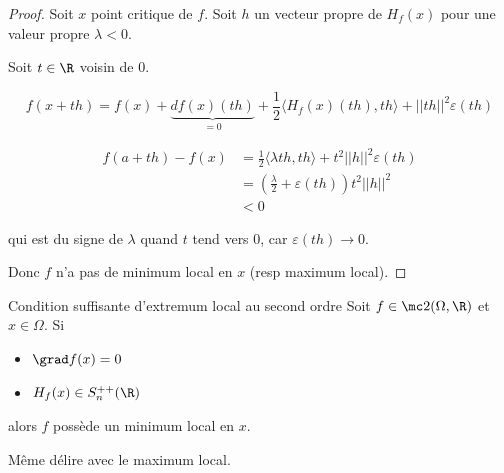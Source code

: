 
\begin{proof}
    Soit $x$ point critique de $f$. Soit $h$ un vecteur propre de 
    $H_f(x)$ pour une valeur propre $\lambda < 0$. 

    Soit $t \in \R$ voisin de $0$.

    $$f(x + th) = f(x) + \underbrace{df(x)(th)}_{= 0} + \frac 1 2 \langle H_f(x) (th), th \rangle + ||th||^2 \varepsilon(th)$$
    
    \begin{align}
        f(a + th) - f(x) & = \frac{1} 2 \langle \lambda th, th \rangle + t^2 ||h||^2 \varepsilon(th) \\
        & = \left( \frac \lambda 2 + \varepsilon(th) \right) t^2 ||h||^2 \\
        & < 0
    \end{align}

    qui est du signe de $\lambda$ quand $t$ tend vers $0$, car $\varepsilon(th) \to 0$.

    Donc $f$ n'a pas de minimum local en $x$ (resp maximum local).
\end{proof}

\begin{theoreme}{Condition suffisante d'extremum local au second ordre}{}
    Soit $f \in \mc 2 (\Omega, \R)$ et $x \in \Omega$. Si 
    \begin{itemize}
        \item $\grad f(x) = 0$
        \item $H_f(x) \in S_n^{++}(\R)$ 
    \end{itemize}
    alors $f$ possède un minimum local en $x$.
\end{theoreme}

\begin{remarque}
    Même délire avec le maximum local.
\end{remarque}

